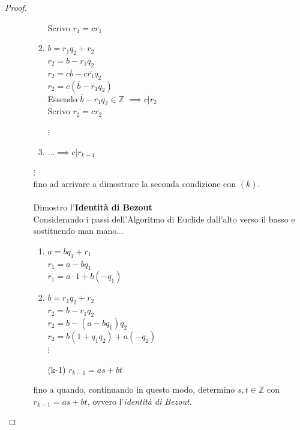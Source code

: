 \documentclass[a4paper,12pt, oneside]{book}
\begin{document}
\begin{proof}
\begin{itemize}
\begin{enumerate}
\begin{enumerate}[label=(\arabic*)]
							Scrivo $r_1 = c\overline{r_1}$
						\item $b = r_1q_2 + r_2$\\
							$r_2 = b-r_1q_2$\\
							$r_2 = c\overline{b}-c\overline{r_1}q_2$\\
							$r_2 = c(\overline{b}-\overline{r_1}q_2)$\\
							Essendo $\overline{b}-\overline{r_1}q_2 \in \mathbb{Z}$ $\implies c|r_2$\\
							
							Scrivo $r_2 = c\overline{r_2}$
							
						$\vdots$
						
						\item $\dots \implies c|r_{k-1}$
					\end{enumerate}
					$\vdots$\\
					fino ad arrivare a dimostrare la seconda condizione con $(k)$.\\\\
										
					Dimostro l'\textbf{Identità di Bezout}\\
					Considerando i passi dell'Algoritmo di Euclide dall'alto verso il basso e sostituendo man mano...
					\begin{enumerate}[label=(\arabic*)]
						\item $a = bq_1 + r_1$\\
							$r_1 = a-bq_1$\\
							$r_1 = a \cdot 1 + b(-q_1)$\\
						\item $b = r_1q_2 + r_2$\\
							$r_2 = b-r_1q_2$\\
							$r_2 = b-(a-bq_1)q_2$\\ 
							$r_2 = b(1+q_1q_2) + a(-q_2)$\\
						
						$\vdots$
						
						\item [(k-1)] $r_{k-1} = as + bt$						
					\end{enumerate}
					fino a quando, continuando in questo modo, determino $s,t \in \mathbb{Z}$ con $r_{k-1} = as + bt$, ovvero l'\textit{identità di Bezout}.					
			\end{enumerate}
		\end{itemize}	
	\end{proof}
	
\end{document}
